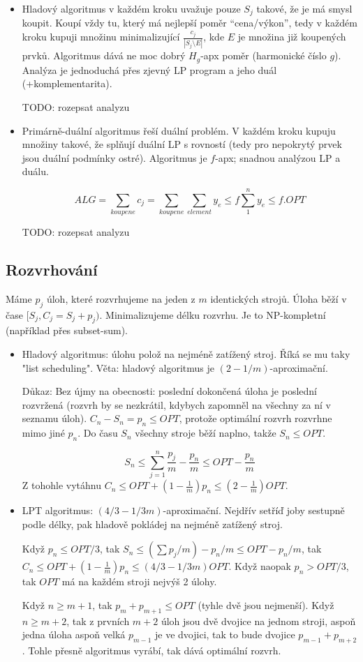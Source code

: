 \documentclass[a4paper,10pt,titlepage]{article} \usepackage[utf8]{inputenc}
\begin{document}
\begin{itemize}
\item	Hladový algoritmus v každém kroku uvažuje pouze $S_j$ takové, že je má smysl koupit.
	Koupí vždy tu, který má nejlepší poměr ``cena/výkon'', tedy v každém kroku kupuji
	množinu minimalizující $\frac{c_j}{|S_j \setminus E|}$, kde $E$ je množina již koupených
	prvků. Algoritmus dává ne moc dobrý $H_g$-apx poměr (harmonické číslo $g$).
	Analýza je jednoduchá přes zjevný LP program a jeho duál (+komplementarita).

	TODO: rozepsat analyzu

\item	Primárně-duální algoritmus řeší duální problém. V každém kroku kupuju množiny takové,
	že splňují duální LP s rovností (tedy pro nepokrytý prvek jsou duální podmínky
	ostré). Algoritmus je $f$-apx; snadnou analýzou LP a duálu.

	$$
	ALG = \sum\limits_{koupene} c_j = \sum\limits_{koupene}\sum\limits_{element} y_e \leq f \sum\limits_{1}^{n} y_e \leq f.OPT
	$$

	TODO: rozepsat analyzu
\end{itemize}

\subsection{Rozvrhování}
Máme $p_j$ úloh, které rozvrhujeme na jeden z $m$ identických strojů.
Úloha běží v čase $[S_j, C_j=S_j+p_j)$. Minimalizujeme délku rozvrhu.
Je to NP-kompletní (například přes subset-sum).

\begin{itemize}
\item Hladový algoritmus: úlohu polož na nejméně zatížený stroj.
	Říká se mu taky "list scheduling".
	Věta: hladový algoritmus je $(2-1/m)$-aproximační.

	Důkaz:
	Bez újmy na obecnosti: poslední dokončená úloha je poslední rozvržená (rozvrh
	by se nezkrátil, kdybych zapomněl na všechny za ní v seznamu úloh).
	$C_n-S_n=p_n\leq OPT$, protože optimální rozvrh rozvrhne mimo jiné $p_n$.
	Do času $S_n$ všechny stroje běží naplno, takže $S_n\leq OPT$.

	$$S_n\leq \sum_{j=1}^n \frac{p_j}{m} - \frac{p_n}{m}\leq OPT-\frac{p_n}{m}$$
	Z tohohle vytáhnu $C_n\leq OPT+(1-\frac{1}{m})p_n\leq (2-\frac{1}{m})OPT$.
\item LPT algoritmus: $(4/3-1/3m)$-aproximační.
	Nejdřív setříď joby sestupně podle délky, pak hladově pokládej na
	nejméně zatížený stroj.

	Když $p_n\leq OPT/3$, tak $S_n\leq (\sum p_j/m)-p_n/m\leq OPT-p_n/m$,
	tak $C_n\leq OPT+(1-\frac{1}{m})p_n\leq (4/3-1/3m)OPT$.
	Když naopak $p_n>OPT/3$, tak $OPT$ má na každém stroji nejvýš
	2 úlohy.

	Když $n\geq m+1$, tak $p_m+p_{m+1}\leq OPT$ (tyhle dvě jsou nejmenší).
	Když $n\geq m+2$, tak z prvních $m+2$ úloh jsou dvě dvojice na jednom
	stroji, aspoň jedna úloha aspoň velká $p_{m-1}$ je ve dvojici,
	tak to bude dvojice $p_{m-1}+p_{m+2}$. Tohle přesně algoritmus
	vyrábí, tak dává optimální rozvrh.
\end{itemize}
\end{document}
